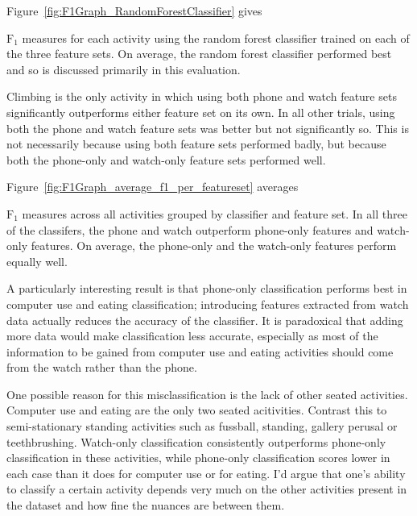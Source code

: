     Figure~\ref{fig:F1Graph_RandomForestClassifier} gives {$\mathrm{F}_1$ measures for each activity using the random forest classifier trained on each of the three feature sets. On average, the random forest classifier performed best and so is discussed primarily in this evaluation.
    
    Climbing is the only activity in which using both phone and watch feature sets significantly outperforms either feature set on its own. In all other trials, using both the phone and watch feature sets was better but not significantly so. This is not necessarily because using both feature sets performed badly, but because both the phone-only and watch-only feature sets performed well. 
  
    Figure~\ref{fig:F1Graph_average_f1_per_featureset} averages {$\mathrm{F}_1$ measures across all activities grouped by classifier and feature set. In all three of the classifers, the phone and watch outperform phone-only features and watch-only features. On average, the phone-only and the watch-only features perform equally well.
    
    A particularly interesting result is that phone-only classification performs best in computer use and eating classification; introducing features extracted from watch data actually reduces the accuracy of the classifier. It is paradoxical that adding more data would make classification less accurate, especially as most of the information to be gained from computer use and eating activities should come from the watch rather than the phone.
    
    One possible reason for this misclassification is the lack of other seated activities. Computer use and eating are the only two seated acitivities. Contrast this to semi-stationary standing activities such as fussball, standing, gallery perusal or teethbrushing. Watch-only classification consistently outperforms phone-only classification in these activities, while phone-only classification scores lower in each case than it does for computer use or for eating. I'd argue that one's ability to classify a certain activity depends very much on the other activities present in the dataset and how fine the nuances are between them. 
    
}}
